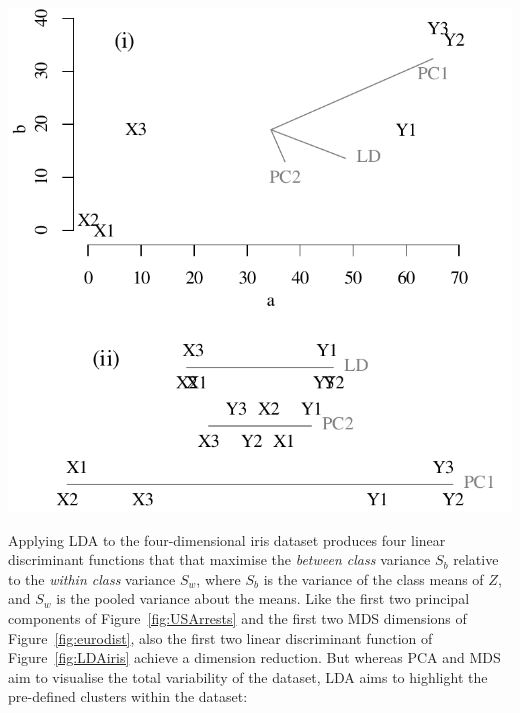 \noindent\includegraphics[width=\linewidth]{../figures/PCAvsLDA.pdf}
\begingroup {}
\label{fig:PCAvsLDA}
\endgroup

Applying LDA to the four-dimensional iris dataset produces four linear
discriminant functions that that maximise the \textit{between class}
variance $S_b$ relative to the \textit{within class} variance $S_w$,
where $S_b$ is the variance of the class means of $Z$, and $S_w$ is
the pooled variance about the means. Like the first two principal
components of Figure~\ref{fig:USArrests} and the first two MDS
dimensions of Figure~\ref{fig:eurodist}, also the first two linear
discriminant function of Figure~\ref{fig:LDAiris} achieve a dimension
reduction. But whereas PCA and MDS aim to visualise the total
variability of the dataset, LDA aims to highlight the pre-defined
clusters within the dataset:

